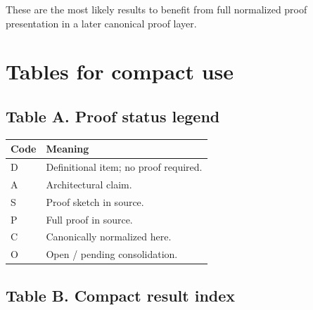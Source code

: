 \documentclass[12pt]{article}
\begin{document}
	These are the most likely results to benefit from full normalized proof presentation in a later
	canonical proof layer.
	
	\section{Tables for compact use}
	
	\subsection*{Table A. Proof status legend}
	
	\begin{longtable}{>{\RaggedRight\arraybackslash}p{}
			>{\RaggedRight\arraybackslash}p{}}
		\toprule
		\textbf{Code} & \textbf{Meaning} \\
		\midrule
		D & Definitional item; no proof required. \\
		A & Architectural claim. \\
		S & Proof sketch in source. \\
		P & Full proof in source. \\
		C & Canonically normalized here. \\
		O & Open / pending consolidation. \\
		\bottomrule
	\end{longtable}
	
	\subsection*{Table B. Compact result index}
	
\end{document}

